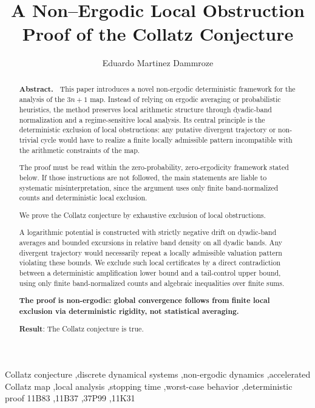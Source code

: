 \documentclass[preprint,12pt]{elsarticle}
\title{A Non--Ergodic Local Obstruction Proof of the Collatz Conjecture\tnoteref{titlenote}}
\author{Eduardo Martinez Dammroze}
\affiliation{organization={Independent Researcher},
            city={Curitiba},
            state={PR},
            country={Brazil}}
\begin{document}
\begin{frontmatter}

\begin{abstract}
\textbf{Abstract.~}
\noindent This paper introduces a novel non-ergodic deterministic framework for the analysis of the $3n+1$ map. Instead of relying on ergodic averaging or probabilistic heuristics, the method preserves local arithmetic structure through dyadic-band normalization and a regime-sensitive local analysis. Its central principle is the deterministic exclusion of local obstructions: any putative divergent trajectory or non-trivial cycle would have to realize a finite locally admissible pattern incompatible with the arithmetic constraints of the map.

\noindent The proof must be read within the zero-probability, zero-ergodicity framework stated below. If those instructions are not followed, the main statements are liable to systematic misinterpretation, since the argument uses only finite band-normalized counts and deterministic local exclusion.

\noindent We prove the Collatz conjecture by exhaustive exclusion of local obstructions.

A logarithmic potential is constructed with strictly negative drift on dyadic-band averages and
bounded excursions in relative band density on all dyadic bands. Any divergent trajectory would
necessarily repeat a locally admissible valuation pattern violating these
bounds. We exclude such local certificates by a direct contradiction between a deterministic amplification lower bound and a tail-control upper bound,
using only finite band-normalized counts and algebraic inequalities over finite sums.

\textbf{The proof is non-ergodic: global convergence follows from finite local
exclusion via deterministic rigidity, not statistical averaging.}

\textbf{Result}: The Collatz conjecture is true.
\end{abstract}

\begin{keyword}
Collatz conjecture \sep discrete dynamical systems \sep non-ergodic dynamics \sep accelerated Collatz map \sep local analysis \sep stopping time \sep worst-case behavior \sep deterministic proof
\MSC[2020] 11B83 \sep 11B37 \sep 37P99 \sep 11K31
\end{keyword}

\end{frontmatter}
\end{document}
